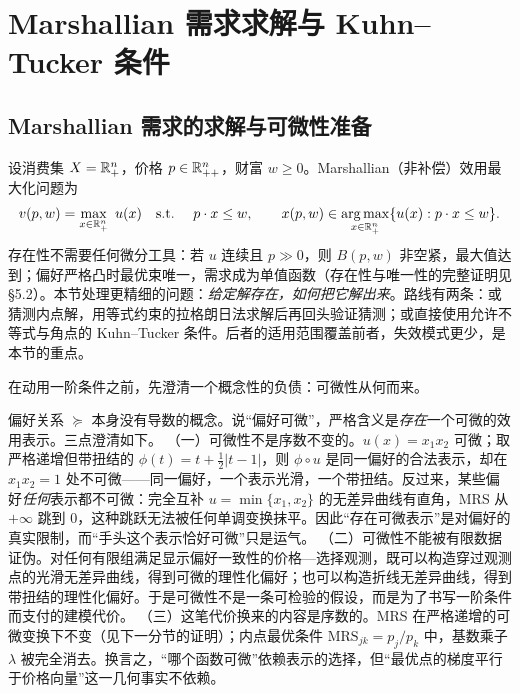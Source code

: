 \section{Marshallian 需求求解与 Kuhn--Tucker 条件}

\subsection{Marshallian 需求的求解与可微性准备}
\label{sec:kt-setup}

设消费集 $X=\mathbb{R}^n_+$，价格 $p\in\mathbb{R}^n_{++}$，财富 $w\ge 0$。Marshallian（非补偿）效用最大化问题为
\begin{equation}
 v(p,w)=\max_{x\in\mathbb{R}^n_+}\ u(x)\quad\text{s.t.}\ \quad p\cdot x\le w,
 \qquad
 x(p,w)\in\operatorname*{arg\,max}_{x\in\mathbb{R}^n_+}\{u(x):p\cdot x\le w\}.
 \label{eq:ump-kt}
\end{equation}
存在性不需要任何微分工具：若 $u$ 连续且 $p\gg 0$，则 $B(p,w)$ 非空紧，最大值达到；偏好严格凸时最优束唯一，需求成为单值函数（存在性与唯一性的完整证明见 \S 5.2）。本节处理更精细的问题：\emph{给定解存在，如何把它解出来}。路线有两条：或猜测内点解，用等式约束的拉格朗日法求解后再回头验证猜测；或直接使用允许不等式与角点的 Kuhn--Tucker 条件。后者的适用范围覆盖前者，失效模式更少，是本节的重点。

在动用一阶条件之前，先澄清一个概念性的负债：可微性从何而来。

\begin{remark}
\label{rem:diff}
偏好关系 $\succeq$ 本身没有导数的概念。说“偏好可微”，严格含义是\emph{存在}一个可微的效用表示。三点澄清如下。
（一）可微性不是序数不变的。$u(x)=x_1x_2$ 可微；取严格递增但带扭结的 $\phi(t)=t+\tfrac12|t-1|$，则 $\phi\circ u$ 是同一偏好的合法表示，却在 $x_1x_2=1$ 处不可微——同一偏好，一个表示光滑，一个带扭结。反过来，某些偏好\emph{任何}表示都不可微：完全互补 $u=\min\{x_1,x_2\}$ 的无差异曲线有直角，MRS 从 $+\infty$ 跳到 $0$，这种跳跃无法被任何单调变换抹平。因此“存在可微表示”是对偏好的真实限制，而“手头这个表示恰好可微”只是运气。
（二）可微性不能被有限数据证伪。对任何有限组满足显示偏好一致性的价格—选择观测，既可以构造穿过观测点的光滑无差异曲线，得到可微的理性化偏好；也可以构造折线无差异曲线，得到带扭结的理性化偏好。于是可微性不是一条可检验的假设，而是为了书写一阶条件而支付的建模代价。
（三）这笔代价换来的内容是序数的。MRS 在严格递增的可微变换下不变（见下一分节的证明）；内点最优条件 $\mathrm{MRS}_{jk}=p_j/p_k$ 中，基数乘子 $\lambda$ 被完全消去。换言之，“哪个函数可微”依赖表示的选择，但“最优点的梯度平行于价格向量”这一几何事实不依赖。
\end{remark}

